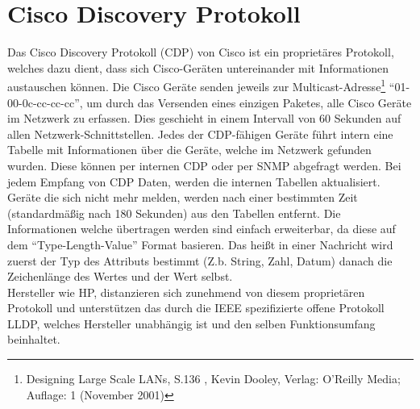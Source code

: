 \section{Cisco Discovery Protokoll}
\label{sec:cdp}

Das Cisco Discovery Protokoll (CDP) von Cisco ist ein proprietäres Protokoll, welches dazu dient, dass sich Cisco-Geräten untereinander mit Informationen austauschen können.
Die Cisco Geräte senden jeweils zur Multicast-Adresse\footnote{Designing Large Scale LANs, S.136 , Kevin Dooley, Verlag: O'Reilly Media; Auflage: 1 (November 2001)} “01-00-0c-cc-cc-cc”, um durch das Versenden eines einzigen Paketes, alle Cisco Geräte im Netzwerk zu erfassen.
Dies geschieht in einem Intervall von 60 Sekunden auf allen Netzwerk-Schnittstellen.
Jedes der CDP-fähigen Geräte führt intern eine Tabelle mit Informationen über die Geräte, welche im Netzwerk gefunden wurden.
Diese können per internen CDP oder per SNMP abgefragt werden.
Bei jedem Empfang von CDP Daten, werden die internen Tabellen aktualisiert. Geräte die sich nicht mehr melden, werden nach einer bestimmten Zeit (standardmäßig nach 180 Sekunden) aus den Tabellen entfernt. Die Informationen welche übertragen werden sind einfach erweiterbar, da diese auf dem “Type-Length-Value” Format basieren. Das heißt in einer Nachricht wird zuerst der Typ des Attributs bestimmt (Z.b. String, Zahl, Datum) danach die Zeichenlänge des Wertes und der Wert selbst.\\
Hersteller wie HP, distanzieren sich zunehmend von diesem proprietären Protokoll und unterstützen das durch die IEEE spezifizierte offene Protokoll LLDP, welches Hersteller unabhängig ist und den selben Funktionsumfang beinhaltet.